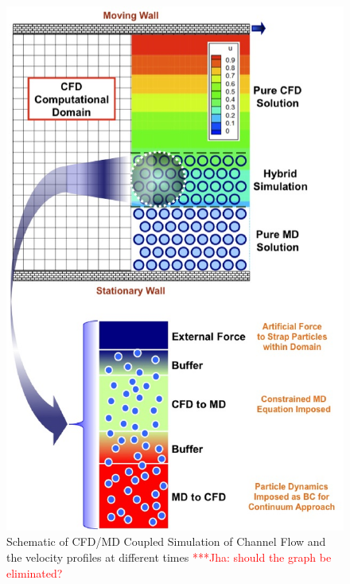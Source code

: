 \documentclass[conference,final]{IEEEtran}
\newcommand{\jhanote}[1]{ {\textcolor{red} { ***Jha: #1 }}}
\newcommand{\jhanote}[1]{}
\begin{document}
\begin{figure}
\centering
\includegraphics[scale=0.33]{fig1.eps}
\caption{\small Schematic of CFD/MD Coupled Simulation of Channel Flow
  and the velocity profiles at different times \jhanote{should the
    graph be eliminated?}}
\label{Fig:Couette}
\end{figure}
\end{document}
